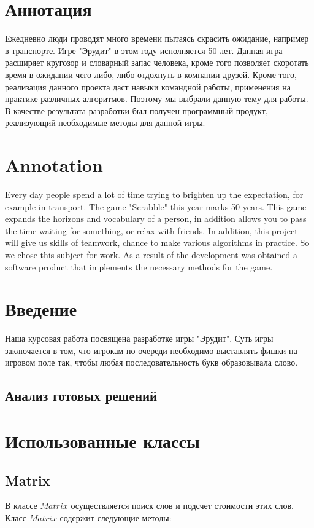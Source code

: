 \documentclass[a4paper,14pt]{article}
\begin{document}

\tableofcontents
\pagebreak
\section{Аннотация}
	Ежедневно люди проводят много времени пытаясь скрасить ожидание, например в транспорте. Игре "Эрудит" в этом году исполняется 50 лет. Данная игра расширяет кругозор и словарный запас человека, кроме того позволяет скоротать время в ожидании чего-либо, либо отдохнуть в компании друзей. Кроме того, реализация данного проекта даст навыки командной работы, применения на практике различных алгоритмов. Поэтому мы выбрали данную тему для работы. В качестве результата разработки был получен программный продукт, реализующий необходимые методы для данной игры.

\section*{Annotation}
Every day people spend a lot of time trying to brighten up the expectation, for example in transport. The game "Scrabble" this year marks 50 years. This game expands the horizons and vocabulary of a person, in addition allows you to pass the time waiting for something, or relax with friends. In addition, this project will give us skills of teamwork, chance to make various algorithms in practice. So we chose this subject for work. As a result of the development was obtained a software product that implements the necessary methods for the game.

\pagebreak

\section{Введение}
	Наша курсовая работа посвящена разработке игры "Эрудит". Суть игры заключается в том, что игрокам по очереди необходимо выставлять фишки на игровом поле так, чтобы любая последовательность букв образовывала слово.
	
	\subsection{Анализ готовых решений}
	
\section{Использованные классы}
	\subsection{Matrix}
	В классе $Matrix$ осуществляется поиск слов и подсчет стоимости этих слов. Класс $Matrix$ содержит следующие методы: 
	
\end{document}
